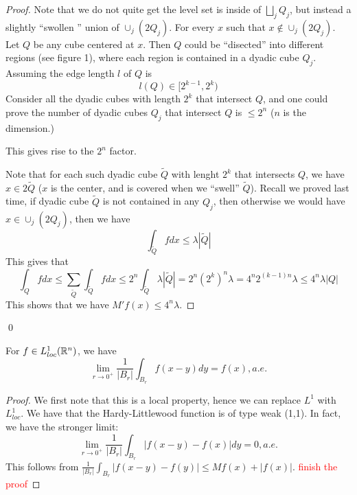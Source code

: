 \begin{proof}
    Note that we do not quite get the level set is inside of $\bigsqcup_jQ_j$, but  instead a slightly ``swollen '' union of $\cup_j(2Q_j)$. For every $x$ such that $x\not\in \cup_j(2Q_j)$. Let $Q$ be any  cube centered at $x$. Then $Q$ could be ``disected'' into different regions (see figure 1), where each region is contained in a dyadic cube $Q_j$. Assuming the edge length $l$ of $Q$ is
    \begin{equation*}
        l(Q)\in [2^{k-1}, 2^k)
    \end{equation*}
    Consider all the dyadic cubes with length $2^k$ that intersect $Q$, and one could prove the number of dyadic cubes $Q_j$ that intersect $Q$ is $\leq 2^n$ ($n$ is the dimension.)
    \begin{note}
        This gives rise to the $2^n$ factor.
    \end{note}
    Note that for each such dyadic cube $\tilde{Q}$ with lenght $2^k$ that intersects $Q$, we have $x\in 2\tilde{Q}$ ($x$ is the center, and is covered when we ``swell'' $\tilde{Q}$). 
    Recall we proved last time, if dyadic cube $\tilde{Q}$ is not contained in any $Q_j$, then otherwise we would have $x\in\cup_j(2Q_j)$, then we have 
    \begin{equation*}
        \int_{\tilde{Q}}fdx\leq\lambda|\tilde{Q}|
    \end{equation*}
    This gives that
    \begin{equation*}
        \int_Qfdx\leq\sum_{\tilde{Q}}\int_{\tilde{Q}}fdx\leq 2^n\int_{\tilde{Q}}\lambda|\tilde{Q}|=2^n(2^k)^n\lambda=4^n 2^{(k-1)n}\lambda\leq 4^n\lambda|Q|
    \end{equation*}
    This shows that we have $M'f(x)\leq 4^n\lambda$.
\end{proof}
\qed


\begin{corollary}
    For $f\in L_{loc}^1(\mathbb{R}^n)$, we have
    \begin{equation*}
        \lim_{r\to 0^+}\frac{1}{|B_r|}\int_{B_r}f(x-y)dy=f(x), a.e.
    \end{equation*}
\end{corollary}
\begin{proof}
    We first note that this is a local property, hence we can replace $L^1$ with $L_{loc}^1$. We have that the Hardy-Littlewood function is of type weak (1,1). In fact, we have the stronger limit:
    \begin{equation*}
        \lim_{r\to 0^+}\frac{1}{|B_r|}\int_{B_r}|f(x-y)-f(x)|dy=0, a.e.
    \end{equation*}
    This follows from $\frac{1}{|B_r|}\int_{B_r}|f(x-y)-f(y)|\leq Mf(x)+|f(x)|$. 
    \textcolor{red}{finish the proof}
\end{proof}

